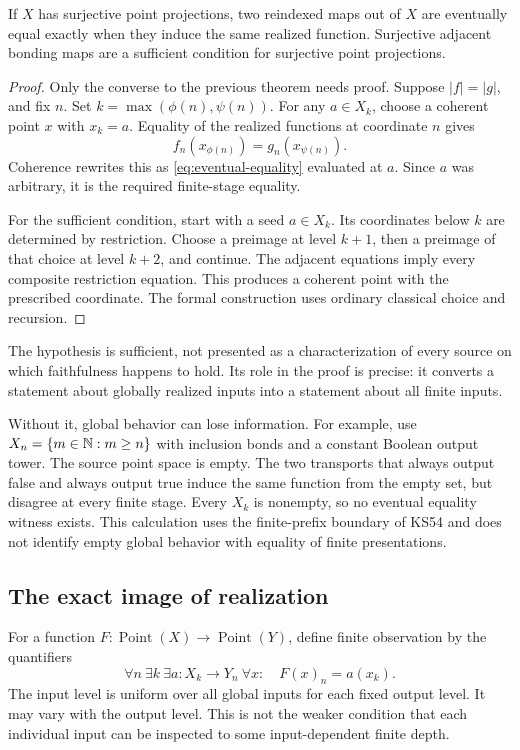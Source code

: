 \begin{theorem}\label{KS62}
If \(X\) has surjective point projections, two reindexed maps out of \(X\) are eventually equal exactly when they induce the same realized function. Surjective adjacent bonding maps are a sufficient condition for surjective point projections.
\end{theorem}
\begin{proof}
Only the converse to the previous theorem needs proof. Suppose \(|f|=|g|\), and fix \(n\). Set \(k=\max(\phi(n),\psi(n))\). For any \(a\in X_k\), choose a coherent point \(x\) with \(x_k=a\). Equality of the realized functions at coordinate \(n\) gives
\[
 f_n(x_{\phi(n)})=g_n(x_{\psi(n)}).
\]
Coherence rewrites this as \eqref{eq:eventual-equality} evaluated at \(a\). Since \(a\) was arbitrary, it is the required finite-stage equality.

For the sufficient condition, start with a seed \(a\in X_k\). Its coordinates below \(k\) are determined by restriction. Choose a preimage at level \(k+1\), then a preimage of that choice at level \(k+2\), and continue. The adjacent equations imply every composite restriction equation. This produces a coherent point with the prescribed coordinate. The formal construction uses ordinary classical choice and recursion.
\end{proof}
The hypothesis is sufficient, not presented as a characterization of every source on which faithfulness happens to hold. Its role in the proof is precise: it converts a statement about globally realized inputs into a statement about all finite inputs.

Without it, global behavior can lose information. For example, use \(X_n=\{m\in\mathbb N:m\ge n\}\) with inclusion bonds and a constant Boolean output tower. The source point space is empty. The two transports that always output false and always output true induce the same function from the empty set, but disagree at every finite stage. Every \(X_k\) is nonempty, so no eventual equality witness exists. This calculation uses the finite-prefix boundary of KS54 and does not identify empty global behavior with equality of finite presentations.

\subsection{The exact image of realization}
For a function \(F:\operatorname{Point}(X)\to\operatorname{Point}(Y)\), define finite observation by the quantifiers
\begin{equation}\label{eq:finite-observation}
 \forall n\ \exists k\ \exists a:X_k\to Y_n\ \forall x:\quad
 F(x)_n=a(x_k).
\end{equation}
The input level is uniform over all global inputs for each fixed output level. It may vary with the output level. This is not the weaker condition that each individual input can be inspected to some input-dependent finite depth.

